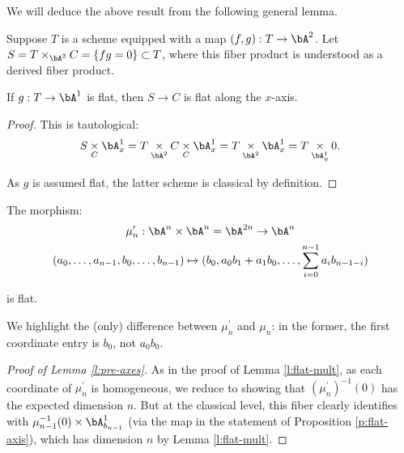 We will deduce the above result from the following general lemma.

\begin{lem}
\notready\label{l:genl-flat-axes}

Suppose $T$ is a scheme equipped with a map $(f,g):T \to \bA^2$.
Let $S = T \times_{\bA^2} C = \{fg = 0\} \subset T$, where this fiber
product is understood as a derived fiber product.

If $g:T \to \bA^1$ is flat, then $S \to C$ is flat along the $x$-axis.

\end{lem}

\begin{proof}

This is tautological:
%
\[
S \underset{C}{\times} \bA_x^1 =
T \underset{\bA^2}{\times} C \underset{C}{\times} \bA_x^1 =
T \underset{\bA^2}{\times} \bA_x^1 =
T \underset{\bA_y^1}{\times} 0.
\]

 As $g$ is assumed flat,
the latter scheme is classical by definition.

\end{proof}

\begin{lem}
\notready\label{l:pre-axes}

The morphism:
%
\[
\begin{gathered}
\mu_n^{\prime}:\bA^n \times \bA^n = \bA^{2n} \to \bA^n \\
(a_0,\ldots,a_{n-1},b_0,\ldots,b_{n-1}) \mapsto
(b_0,a_0b_1+a_1b_0,\ldots,\sum_{i = 0}^{n-1} a_ib_{n-1-i})
\end{gathered}
\]

 is flat.

\end{lem}

\begin{rem}
\notready

We highlight the (only) difference between $\mu_n^{\prime}$ and
$\mu_n$:
in the former, the first coordinate entry is $b_0$, not $a_0b_0$.

\end{rem}

\begin{proof}[Proof of Lemma \ref{l:pre-axes}]

As in the proof of Lemma \ref{l:flat-mult},
as each coordinate of $\mu_n^{\prime}$ is homogeneous, we
reduce to showing that $(\mu_n^{\prime})^{-1}(0)$ has the expected
dimension $n$. But at the classical level,
this fiber clearly identifies with
$\mu_{n-1}^{-1}(0) \times \bA_{b_{n-1}}^1$ (via the map in the statement
of Proposition \ref{p:flat-axis}),
which has dimension $n$ by Lemma \ref{l:flat-mult}.

\end{proof}

